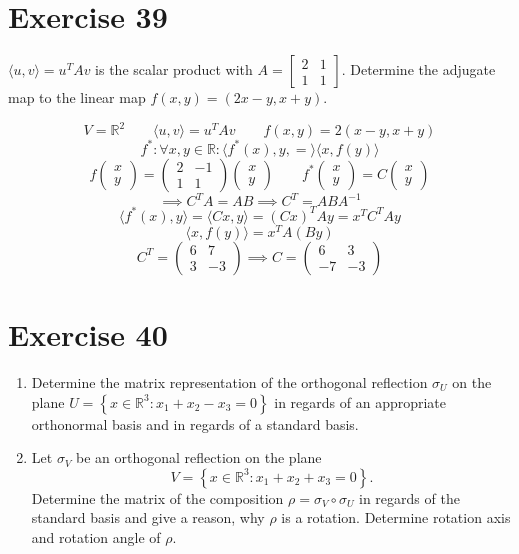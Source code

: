 \documentclass[a4paper]{article}
\theoremstyle{definition}
\newcommand\set[1]{\left\{#1\right\}}
\newcommand\ip[2]{\langle{#1},{#2}\rangle}
\begin{document}
\section*{Exercise 39}
\begin{ex}
  $\ip uv = u^T Av$ is the scalar product with $A = \begin{bmatrix} 2 & 1 \\ 1 & 1 \end{bmatrix}$.
  Determine the adjugate map to the linear map $f(x,y) = (2x - y, x + y)$.
\end{ex}
\[ V = \mathbb R^2 \qquad \ip uv = u^T Av \qquad f(x,y) = 2(x-y,x+y) \]
\[ f^*: \forall x, y \in \mathbb R: \ip{f^*(x),y} = \ip{x}{f(y)} \]
\[ f\begin{pmatrix} x \\ y \end{pmatrix} = \begin{pmatrix} 2 & -1 \\ 1 & 1 \end{pmatrix} \begin{pmatrix} x \\ y \end{pmatrix} \qquad f^*\begin{pmatrix} x \\ y \end{pmatrix} = C\begin{pmatrix} x \\ y \end{pmatrix} \]
\[ \implies C^T A = AB \implies C^T = ABA^{-1} \]
\[ \ip{f^*(x)}{y} = \ip{Cx}{y} = (Cx)^T Ay = x^T C^T Ay \]
\[ \ip{x}{f(y)} = x^T A(By) \]
\[  C^T = \begin{pmatrix} 6 & 7 \\ 3 & -3 \end{pmatrix} \implies C = \begin{pmatrix} 6 & 3 \\ -7 & -3 \end{pmatrix} \]

\section*{Exercise 40}
\begin{ex}
  \begin{enumerate}
    \item Determine the matrix representation of the orthogonal reflection $\sigma_U$ on the plane $U = \set{x \in \mathbb R^3: x_1 + x_2 - x_3 = 0}$
    in regards of an appropriate orthonormal basis and in regards of a standard basis.
    \item Let $\sigma_V$ be an orthogonal reflection on the plane
      \[ V = \set{x \in \mathbb R^3: x_1 + x_2 + x_3 = 0}. \]
      Determine the matrix of the composition $\rho = \sigma_V \circ \sigma_U$ in regards of the standard basis and give a reason, why $\rho$ is a rotation. Determine rotation axis and rotation angle of $\rho$.
  \end{enumerate}
\end{ex}
\end{document}
